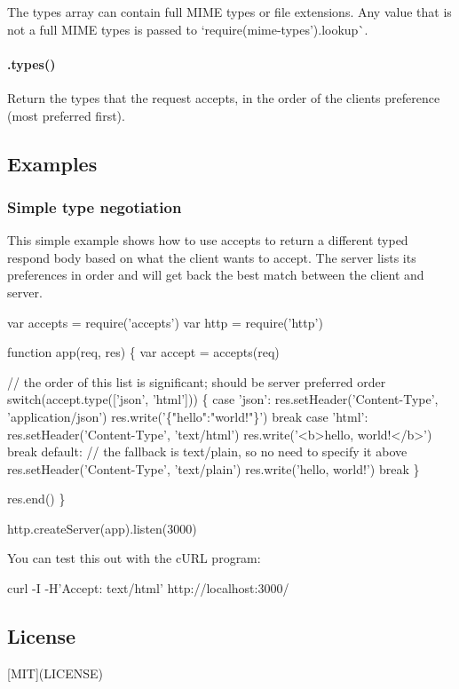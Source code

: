 The {\ttfamily types} array can contain full M\+I\+ME types or file extensions. Any value that is not a full M\+I\+ME types is passed to `require(\textquotesingle{}mime-\/types').lookup\`{}.

\paragraph*{.types()}

Return the types that the request accepts, in the order of the client\textquotesingle{}s preference (most preferred first).

\subsection*{Examples}

\subsubsection*{Simple type negotiation}

This simple example shows how to use {\ttfamily accepts} to return a different typed respond body based on what the client wants to accept. The server lists it\textquotesingle{}s preferences in order and will get back the best match between the client and server.


\begin{DoxyCode}
var accepts = require('accepts')
var http = require('http')

function app(req, res) \{
  var accept = accepts(req)

  // the order of this list is significant; should be server preferred order
  switch(accept.type(['json', 'html'])) \{
    case 'json':
      res.setHeader('Content-Type', 'application/json')
      res.write('\{"hello":"world!"\}')
      break
    case 'html':
      res.setHeader('Content-Type', 'text/html')
      res.write('<b>hello, world!</b>')
      break
    default:
      // the fallback is text/plain, so no need to specify it above
      res.setHeader('Content-Type', 'text/plain')
      res.write('hello, world!')
      break
  \}

  res.end()
\}

http.createServer(app).listen(3000)
\end{DoxyCode}


You can test this out with the c\+U\+RL program\+: 
\begin{DoxyCode}
curl -I -H'Accept: text/html' http://localhost:3000/
\end{DoxyCode}


\subsection*{License}

\mbox{[}M\+IT\mbox{]}(L\+I\+C\+E\+N\+SE) 